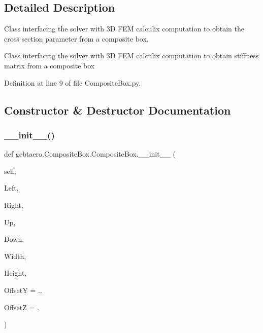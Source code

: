 \subsection{Detailed Description}
Class interfacing the solver with 3D F\+EM calculix computation to obtain the cross section parameter from a composite box. 

\begin{DoxyVerb}Class interfacing the solver with 3D FEM calculix computation to obtain stiffness matrix
from a composite box
\end{DoxyVerb}
 

Definition at line 9 of file Composite\+Box.\+py.



\subsection{Constructor \& Destructor Documentation}
\mbox{\label{classgebtaero_1_1_composite_box_1_1_composite_box_a64c4292dbd036313813fc00a78fb13cb}} 
\subsubsection{\texorpdfstring{\+\_\+\+\_\+init\+\_\+\+\_\+()}{\_\_init\_\_()}}
{\footnotesize\ttfamily def gebtaero.\+Composite\+Box.\+Composite\+Box.\+\_\+\+\_\+init\+\_\+\+\_\+ (\begin{DoxyParamCaption}\item[{}]{self,  }\item[{}]{Left,  }\item[{}]{Right,  }\item[{}]{Up,  }\item[{}]{Down,  }\item[{}]{Width,  }\item[{}]{Height,  }\item[{}]{OffsetY = {.},  }\item[{}]{OffsetZ = {.} }\end{DoxyParamCaption})}



